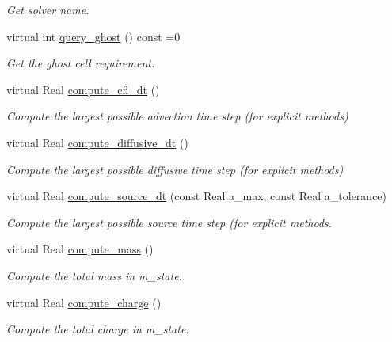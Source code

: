 \begin{DoxyCompactItemize}
\begin{DoxyCompactList}\small\item\em Get solver name. \end{DoxyCompactList}\item 
virtual int \hyperlink{classcdr__solver_af78d9b0b357fda0bfb33ef1640f9cbde}{query\+\_\+ghost} () const =0
\begin{DoxyCompactList}\small\item\em Get the ghost cell requirement. \end{DoxyCompactList}\item 
virtual Real \hyperlink{classcdr__solver_a803415edeae8805c9f69161986844ea0}{compute\+\_\+cfl\+\_\+dt} ()
\begin{DoxyCompactList}\small\item\em Compute the largest possible advection time step (for explicit methods) \end{DoxyCompactList}\item 
virtual Real \hyperlink{classcdr__solver_af576b9f2e00c22c15ec473302ffc161d}{compute\+\_\+diffusive\+\_\+dt} ()
\begin{DoxyCompactList}\small\item\em Compute the largest possible diffusive time step (for explicit methods) \end{DoxyCompactList}\item 
virtual Real \hyperlink{classcdr__solver_a013c4442f1f27c58935f56e870cdc478}{compute\+\_\+source\+\_\+dt} (const Real a\+\_\+max, const Real a\+\_\+tolerance)
\begin{DoxyCompactList}\small\item\em Compute the largest possible source time step (for explicit methods. \end{DoxyCompactList}\item 
virtual Real \hyperlink{classcdr__solver_a7dc781bec0e435deb6c486dbe41a0e5c}{compute\+\_\+mass} ()
\begin{DoxyCompactList}\small\item\em Compute the total mass in m\+\_\+state. \end{DoxyCompactList}\item 
virtual Real \hyperlink{classcdr__solver_a3d20bb879b40364f108bec08cfbc5d6c}{compute\+\_\+charge} ()
\begin{DoxyCompactList}\small\item\em Compute the total charge in m\+\_\+state. \end{DoxyCompactList}\item 

\end{DoxyCompactItemize}
